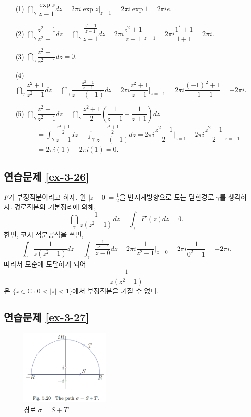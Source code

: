 \begin{itemize}
\item[(1)] $\dint_\gamma \dfrac{\exp z}{z-1}dz = 2\pi i \exp z \Big|_{z=1}
= 2\pi i \exp 1 = 2\pi i  e$.
\item[(2)] $\dint_\gamma \dfrac{z^2+1}{z^2-1}dz 
= \dint_\gamma \dfrac {\frac{z^2+1}{z+1}}{z-1}dz
= 2\pi i \dfrac{z^2+1}{z+1} \Big|_{z=1} = 2\pi i \dfrac{1^2+1}{1+1} = 2\pi i$.
\item[(3)] $\dint_\gamma \dfrac{z^2+1}{z^2-1}dz = 0$.
\item[(4)] $\dint_\gamma \dfrac{z^2+1}{z^2-1}dz 
= \dint_\gamma \dfrac{\frac{z^2+1}{z-1}}{z-(-1)}dz 
= 2\pi i \dfrac{z^2+1}{z-1} \Big|_{z=-1} = 2\pi i \dfrac{(-1)^2+1}{-1-1} = -2\pi i$.
\item[(5)] $\dint_\gamma \dfrac{z^2+1}{z^2-1}dz 
= \dint_\gamma \dfrac{z^2+1}2 \left(\dfrac1{z-1} - \dfrac1{z+1}\right)dz$
\begin{align*}
\quad &= \int_\gamma \dfrac{\frac{z^2+1}2}{z-1}dz 
- \int_\gamma \dfrac{\frac{z^2+1}2}{z-(-1)}dz 
= 2\pi i \dfrac{z^2+1}2\Big|_{z=1} - 2\pi i \dfrac{z^2+1}2 \Big|_{z=-1} \\
&= 2\pi i(1) - 2\pi i (1) = 0.
\end{align*}
\end{itemize}

\subsection*{연습문제 \ref{ex-3-26}}

$F$가 부정적분이라고 하자.
원 $|z-0| = \frac12$을 반시계방향으로 도는 닫힌경로 $\gamma$를 생각하자.
경로적분의 기본정리에 의해,
\[
\dint_\gamma \dfrac1{z(z^2-1)}dz = \int_\gamma F'(z)dz = 0.
\]
한편,  코시 적분공식을 쓰면,
\[
\int_\gamma \dfrac1{z(z^2-1)}dz = \int_\gamma  \dfrac{\frac1{z^2-1}}{z-0}dz
= 2\pi i \dfrac1{z^2-1}\Big|_{z=0} = 2\pi i \dfrac1{0^2-1} = - 2\pi i.
\]
따라서 모순에 도달하게 되어
\[
\dfrac1{z(z^2-1)}
\]
은 $\{z\in\mathbb C\,:\, 0<|z|<1\}$에서 부정적분을 가질 수 없다.

\subsection*{연습문제 \ref{ex-3-27}}

\begin{figure}[h!]
\begin{center}
\includegraphics[width=0.4\textwidth]{./figs/fig-5-20}
\end{center}
\caption{경로 $\sigma=S+T$}
\label{fig-5-20}
\end{figure}

